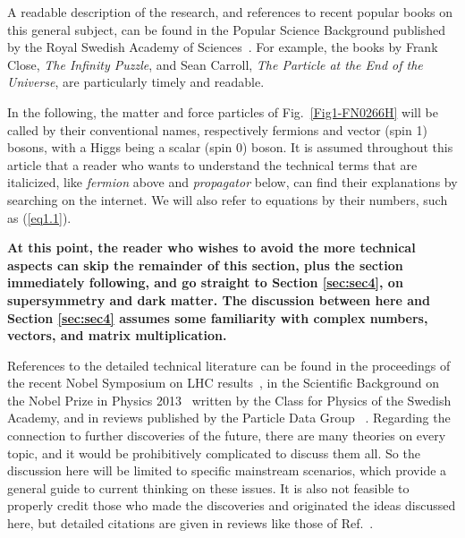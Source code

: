 \documentclass[12pt]{iopart}
\begin{document}
A readable description of the research, and references to recent popular books on this general subject, can be found in the Popular Science Background published by the Royal Swedish Academy of Sciences~\cite{popular}. For example, the books by Frank Close, \textit{The Infinity Puzzle}, and Sean Carroll, \textit{The Particle at the End of the Universe}, are particularly timely and readable.

In the following, the matter and force particles of Fig.~\ref{Fig1-FN0266H} will be called by their conventional names, respectively fermions and vector (spin 1) bosons, with a Higgs being a scalar (spin 0) boson. It is assumed throughout this article that a reader who wants to understand the technical terms that are italicized, like \textit{fermion} above and \textit{propagator} below, can find their explanations by searching on the internet. We will also refer to equations by their numbers, such as (\ref{eq1.1}). 

\textbf{At this point, the reader who wishes to avoid the more technical aspects can skip the remainder of this section, plus the section immediately following, and go straight to Section \ref{sec:sec4}, on supersymmetry and dark matter. The discussion between here and Section \ref{sec:sec4} assumes some familiarity with complex numbers, vectors, and matrix multiplication.}

References to the detailed technical literature can be found in the proceedings of the recent Nobel Symposium on LHC results~\cite{Symposium}, in the Scientific Background on the Nobel Prize in Physics 2013~\cite{scientific} written by the Class for Physics of the Swedish Academy, and in reviews published by the Particle Data Group~\cite{pdg} . Regarding the connection to further discoveries of the future, there are many theories on every topic, and it would be prohibitively complicated to discuss them all. So the discussion here will be limited to specific mainstream scenarios, which provide a general guide to current thinking on these issues. It is also not feasible to properly credit those who made the discoveries and originated the ideas discussed here, but detailed citations are given in reviews like those of Ref.~\cite{pdg}.
\end{document}
